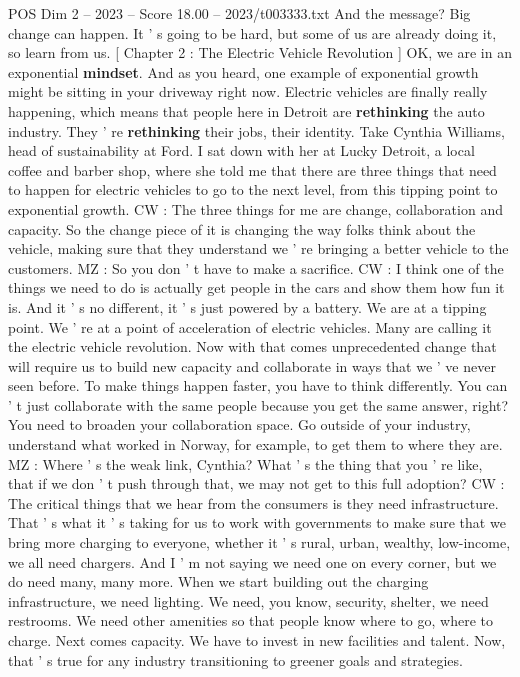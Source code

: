 \begin{textsample}{POS Dim 2 – 2023 – Score 18.00 – 2023/t003333.txt}
And the message?
Big change can happen.
It ' s going to be hard, but some of us are already doing it, so learn from us. [ Chapter 2 : The Electric Vehicle Revolution ] OK, we are in an exponential \textbf{mindset}.
And as you heard, one example of exponential growth might be sitting in your driveway right now.
Electric vehicles are finally really happening, which means that people here in Detroit are \textbf{rethinking} the auto industry.
They ' re \textbf{rethinking} their jobs, their identity.
Take Cynthia Williams, head of sustainability at Ford.
I sat down with her at Lucky Detroit, a local coffee and barber shop, where she told me that there are three things that need to happen for electric vehicles to go to the next level, from this tipping point to exponential growth.
CW : The three things for me are change, collaboration and capacity.
So the change piece of it is changing the way folks think about the vehicle, making sure that they understand we ' re bringing a better vehicle to the customers.
MZ : So you don ' t have to make a sacrifice.
CW : I think one of the things we need to do is actually get people in the cars and show them how fun it is.
And it ' s no different, it ' s just powered by a battery.
We are at a tipping point.
We ' re at a point of acceleration of electric vehicles.
Many are calling it the electric vehicle revolution.
Now with that comes unprecedented change that will require us to build new capacity and collaborate in ways that we ' ve never seen before.
To make things happen faster, you have to think differently.
You can ' t just collaborate with the same people because you get the same answer, right?
You need to broaden your collaboration space.
Go outside of your industry, understand what worked in Norway, for example, to get them to where they are.
MZ : Where ' s the weak link, Cynthia?
What ' s the thing that you ' re like, that if we don ' t push through that, we may not get to this full adoption?
CW : The critical things that we hear from the consumers is they need infrastructure.
That ' s what it ' s taking for us to work with governments to make sure that we bring more charging to everyone, whether it ' s rural, urban, wealthy, low-income, we all need chargers.
And I ' m not saying we need one on every corner, but we do need many, many more.
When we start building out the charging infrastructure, we need lighting.
We need, you know, security, shelter, we need restrooms.
We need other amenities so that people know where to go, where to charge.
Next comes capacity.
We have to invest in new facilities and talent.
Now, that ' s true for any industry transitioning to greener goals and strategies.

\end{textsample}
